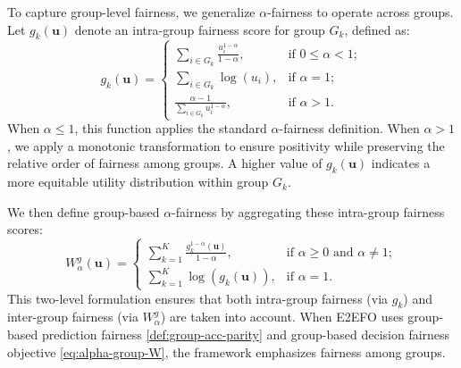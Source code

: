 \documentclass[ijoc,sglanonrev]{informs4}
\begin{document}
To capture group-level fairness, we generalize $\alpha$-fairness to operate across groups. Let $g_k(\mathbf{u})$ denote an intra-group fairness score for group $G_k$, defined as:
\begin{equation} \label{eq:alpha-group-g}
g_k(\mathbf{u}) = 
\begin{cases}
    \sum_{i \in G_k} \frac{u_i^{1 - \alpha}}{1-\alpha}, & \text{if } 0 \leq \alpha < 1; \\
    \sum_{i \in G_k} \log(u_i), & \text{if } \alpha = 1; \\
    \frac{\alpha - 1}{\sum_{i \in G_k} u_i^{1-\alpha}}, & \text{if } \alpha > 1.
\end{cases}
\end{equation}
When $\alpha \leq 1$, this function applies the standard $\alpha$-fairness definition. When $\alpha > 1$, we apply a monotonic transformation to ensure positivity while preserving the relative order of fairness among groups. A higher value of $g_k(\mathbf{u})$ indicates a more equitable utility distribution within group $G_k$.

We then define group-based $\alpha$-fairness by aggregating these intra-group fairness scores:
\begin{equation} \label{eq:alpha-group-W}
    W^g_{\alpha}(\mathbf{u}) = 
\begin{cases}
    \sum_{k=1}^{K} \frac{g_k^{1 - \alpha}(\mathbf{u})}{1-\alpha}, &\text{if } \alpha \geq 0 \text{ and } \alpha \neq 1; \\
    \sum_{k=1}^{K} \log(g_k(\mathbf{u})), &\text{if } \alpha = 1.
\end{cases}
\end{equation}
This two-level formulation ensures that both intra-group fairness (via $g_k$) and inter-group fairness (via $W^g_{\alpha}$) are taken into account. When E2EFO uses group-based prediction fairness \eqref{def:group-acc-parity} and group-based decision fairness objective \eqref{eq:alpha-group-W}, the framework emphasizes fairness among groups.
\end{document}
